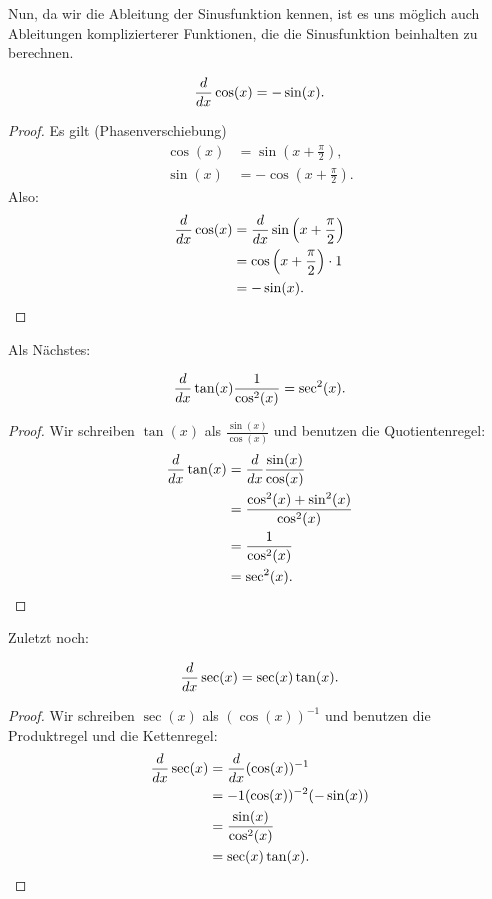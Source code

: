 Nun, da wir die Ableitung der Sinusfunktion kennen, ist es uns möglich auch Ableitungen komplizierterer Funktionen, die die Sinusfunktion beinhalten zu berechnen.


\begin{theorem}
\[
\frac{d}{dx} \cos(x) = -\sin(x).
\]
\end{theorem}

\begin{proof}
Es gilt (Phasenverschiebung)
\begin{align*}
\cos(x) &= \sin\left(x+\frac{\pi}{2}\right), \\
\sin(x) &= -\cos\left(x+\frac{\pi}{2}\right).
\end{align*}
Also:
\begin{align*}
\frac{d}{dx} \cos(x) &= \frac{d}{dx} \sin\left(x+\frac{\pi}{2}\right)\\
&=\cos\left(x+\frac{\pi}{2}\right)\cdot 1 \\
&= -\sin(x).
\end{align*}
\end{proof}

Als Nächstes:

\begin{theorem}
\[
\frac{d}{dx} \tan(x) \frac{1}{\cos^2(x)} = \sec^2(x).
\]
\end{theorem}

\begin{proof}
Wir schreiben $\tan(x)$ als $\frac{\sin(x)}{\cos(x)}$ und benutzen die Quotientenregel:
\begin{align*}
\frac{d}{dx}\tan(x) &= \frac{d}{dx}\frac{\sin(x)}{\cos(x)}\\
&=\frac{\cos^2(x) + \sin^2(x)}{\cos^2(x)}\\
&=\frac{1}{\cos^2(x)}\\
&=\sec^2(x).
\end{align*}
\end{proof}

Zuletzt noch:

\begin{theorem}
\[
\frac{d}{dx} \sec(x) = \sec(x)\tan(x).
\]
\end{theorem}

\begin{proof}
Wir schreiben $\sec(x)$ als $(\cos(x))^{-1}$ und benutzen die Produktregel und die Kettenregel:
\begin{align*}
\frac{d}{dx} \sec(x) &= \frac{d}{dx}(\cos (x))^{-1}\\
&=-1(\cos(x))^{-2}(-\sin(x)) \\
&= \frac{\sin(x)}{\cos^2(x)} \\
&= \sec(x)\tan(x).
\end{align*}
\end{proof}


